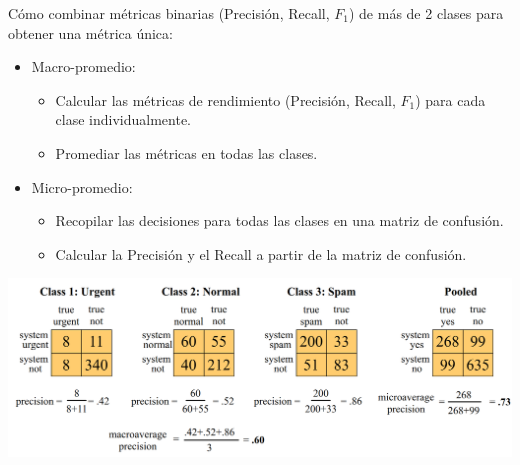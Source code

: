 \documentclass[11pt,fleqn]{book} %
\begin{document}
Cómo combinar métricas binarias (Precisión, Recall, $F_1$) de más de 2 clases para obtener una métrica única:
\begin{itemize}
 \item Macro-promedio:
 \begin{itemize}
    \item Calcular las métricas de rendimiento (Precisión, Recall, $F_1$) para cada clase individualmente.
    \item Promediar las métricas en todas las clases.
 \end{itemize}
 \item Micro-promedio:
 \begin{itemize}
    \item Recopilar las decisiones para todas las clases en una matriz de confusión.
    \item Calcular la Precisión y el Recall a partir de la matriz de confusión.
 \end{itemize}
\end{itemize}

\begin{center}
\includegraphics[scale=0.23]{pics/confmatrixmulti.png}
\end{center}





\end{document}
